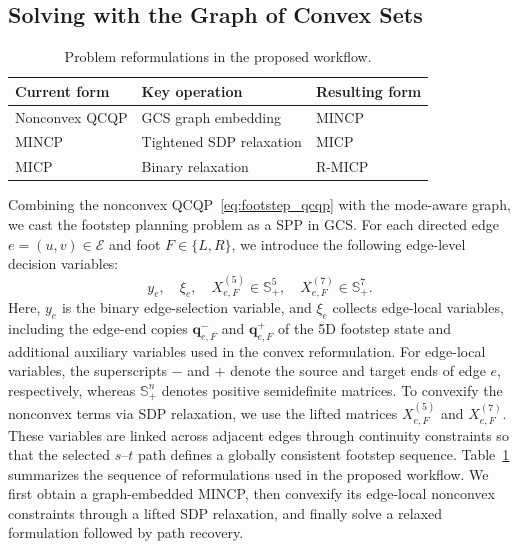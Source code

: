 \documentclass[letterpaper, 10 pt, journal, twoside]{IEEEtran}
\begin{document}
\subsection{Solving with the Graph of Convex Sets}
\label{sec:solve_gcs}
\begin{table}[t]
\vspace{-3mm}
\centering
\caption{Problem reformulations in the proposed workflow.}
\label{tab:problem_transformation}
\footnotesize
\setlength{\tabcolsep}{4pt}
\renewcommand{\arraystretch}{1.1}
\begin{tabularx}{\columnwidth}{l X l}
\toprule
\textbf{Current form} & \textbf{Key operation} & \textbf{Resulting form} \\
\midrule
Nonconvex QCQP & GCS graph embedding & MINCP \\
MINCP & Tightened SDP relaxation & MICP \\
MICP & Binary relaxation & R-MICP \\
\bottomrule
\end{tabularx}
\vspace{-5mm}
\end{table}
Combining the nonconvex QCQP~\eqref{eq:footstep_qcqp} with the mode-aware graph, we cast the footstep planning problem as a SPP in GCS.
For each directed edge $e=(u,v)\in\mathcal E$ and foot $F\in\{L,R\}$, we introduce the following edge-level decision variables:
\begin{equation}
y_e,\quad \xi_e,\quad X_{e,F}^{(5)}\in\mathbb S_+^5,\quad X_{e,F}^{(7)}\in\mathbb S_+^7.
\label{eq:gcs_decision_variables}
\end{equation}
Here, $y_e$ is the binary edge-selection variable, and $\xi_e$ collects edge-local variables, including the edge-end copies $\mathbf{q}_{e,F}^{-}$ and $\mathbf{q}_{e,F}^{+}$ of the 5D footstep state and additional auxiliary variables used in the convex reformulation.
For edge-local variables, the superscripts \( - \) and \( + \) denote the source and target ends of edge \(e\), respectively, whereas \(\mathbb S_+^n\) denotes positive semidefinite matrices.
To convexify the nonconvex terms via SDP relaxation, we use the lifted matrices $X_{e,F}^{(5)}$ and $X_{e,F}^{(7)}$.
These variables are linked across adjacent edges through continuity constraints so that the selected $s$--$t$ path defines a globally consistent footstep sequence.
Table~\ref{tab:problem_transformation} summarizes the sequence of reformulations used in the proposed workflow.
We first obtain a graph-embedded MINCP, then convexify its edge-local nonconvex constraints through a lifted SDP relaxation, and finally solve a relaxed formulation followed by path recovery.
\end{document}
